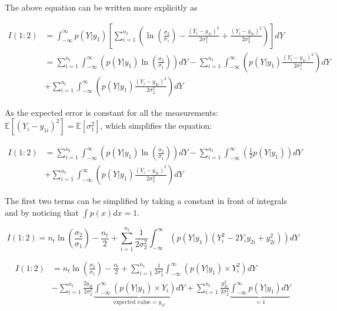 \documentclass[]{scrartcl}
\begin{document}
The above equation can be written more explicitly as

\begin{align}
	I(1:2) &= \int_{-\infty}^{\infty} p(Y|y_1) \left[ \sum_{i=1}^{n_t} \left( \ln\left( \frac{\sigma_2}{\sigma_1} \right) - \frac{(Y_i - y_{1i})^2}{2\sigma_1^2} + \frac{(Y_i - y_{2i})^2}{2\sigma_2^2}\right) \right] dY \nonumber \\
	&= \sum_{i=1}^{n_t} \int_{-\infty}^{\infty} \left( p(Y|y_1) \ln\left(\frac{\sigma_2}{\sigma_1}\right) \right) dY - \sum_{i=1}^{n_t} \int_{-\infty}^{\infty} \left( p(Y|y_1) \frac{(Y_i-y_{1i})^2}{2\sigma_1^2} \right) dY \nonumber \\ 
	&+ \sum_{i=1}^{n_t} \int_{-\infty}^{\infty} \left( p(Y|y_1) \frac{(Y_i-y_{2i})^2}{2\sigma_2^2}  \right) dY
\end{align}

As the expected error is constant for all the measurements: $\mathbb{E}[(Y_i-y_{1i})^2]=\mathbb{E}[\sigma_1^2]$, which simplifies the equation:

\begin{align}
	I(1:2) &= \sum_{i=1}^{n_t} \int_{-\infty}^{\infty} \left( p(Y|y_1) \ln \left(\frac{\sigma_2}{\sigma_1} \right) \right) dY - \sum_{i=1}^{n_t} \int_{-\infty}^{\infty} \left( \frac{1}{2} p(Y|y_1) \right) dY \nonumber \\ 
	&+ \sum_{i=1}^{n_t} \int_{-\infty}^{\infty} \left( p(Y|y_1) \frac{(Y_i-y_{2i})^2}{2\sigma_2^2}  \right) dY
\end{align} 

The first two terms can be simplified by taking a constant in front of integrals and by noticing that $\int p(x) dx = 1$. 

\begin{equation}
	I(1:2) = n_t \ln \left(\frac{\sigma_2}{\sigma_1} \right) - \frac{n_t}{2} + \sum_{i=1}^{n_t} \frac{1}{2\sigma_2^2} \int_{-\infty}^{\infty} \left( p(Y|y_1) \left( Y_i^2 - 2Y_iy_{2i} + y_{2i}^2 \right)  \right) dY
\end{equation} 

\begin{align}
	I(1:2) &= n_t \ln \left(\frac{\sigma_2}{\sigma_1} \right) - \frac{n_t}{2} + \sum_{i=1}^{n_t} \frac{1}{2\sigma_2^2} \int_{-\infty}^{\infty} \left( p(Y|y_1) \times Y_i^2  \right) dY \nonumber \\ 
	&-\sum_{i=1}^{n_t} \frac{2y_{2i}}{2\sigma_2^2} \underbrace{\int_{-\infty}^{\infty} \left( p(Y|y_1) \times Y_i  \right) dY}_{\text{expected value} = y_{1i} } +\sum_{i=1}^{n_t} \frac{y_{2i}^2}{2\sigma_2^2} \underbrace{\int_{-\infty}^{\infty} p(Y|y_1) dY}_{=1}
\end{align} 
\end{document}
